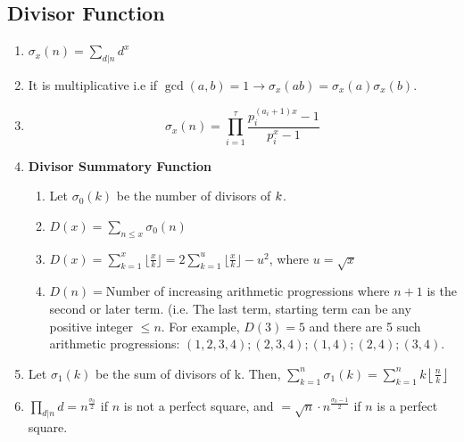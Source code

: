 \subsection{Divisor Function}
\begin{enumerate}[resume]
    \item $\displaystyle \sigma_x(n)=\sum\limits_{d\vert n}^{}d^x$
    \item It is multiplicative i.e if $\displaystyle \gcd(a, b)=1\to \sigma_x(ab)=\sigma_x(a)\sigma_x(b)$.
    \item \[\displaystyle \sigma_x(n)=\prod\limits_{i=1}^{\tau}\frac{p_i^{(a_i+1)x}-1}{p_i^x-1}\]
    \item \textbf{Divisor Summatory Function}
          \begin{enumerate}
              \item Let $\displaystyle \sigma_0(k)$ be the number of divisors of $\displaystyle \displaystyle k$.
              \item $D(x)=\sum\limits_{n\leq{x}}{\sigma_0(n)}$
              \item $D(x)=\sum\limits_{k=1}^{x}\lfloor\frac{x}{k}\rfloor=2\sum\limits_{k=1}^{u}\lfloor\frac{x}{k}\rfloor-u^2$, where $u=\sqrt{x}$
              \item $D(n)=$Number of increasing arithmetic progressions where $n+1$ is the second or later term. (i.e. The last term, starting term can be any positive integer $\displaystyle \le n$. For example, $D(3)=5$ and there are 5 such arithmetic progressions: $\displaystyle (1, 2, 3, 4); (2, 3, 4); (1, 4); (2, 4); (3, 4).$
          \end{enumerate}
    \item Let $\displaystyle \sigma_1(k)$ be the sum of divisors of k. Then, $\displaystyle \sum\limits_{k=1}^{n}\sigma_1(k)=\sum\limits_{k=1}^{n}{k \left\lfloor \frac{n}{k} \right\rfloor}$
    \item $\displaystyle \prod\limits_{d\vert n}^{}d={n^{\frac{\sigma_0}{2}}}$ if $n$ is not a perfect square, and $=\sqrt{n} \cdot n^{\frac{\sigma_0-1}{2}}$ if $n $ is a perfect square.
\end{enumerate}
